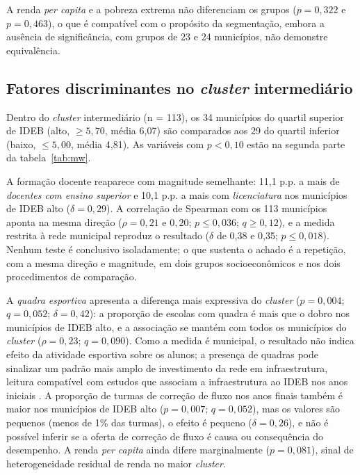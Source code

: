 A renda \textit{per capita} e a pobreza extrema não diferenciam os grupos ($p = 0{,}322$ e $p = 0{,}463$), o que é compatível com o propósito da segmentação, embora a ausência de significância, com grupos de 23 e 24 municípios, não demonstre equivalência.

\subsection{Fatores discriminantes no \textit{cluster} intermediário}

Dentro do \textit{cluster} intermediário (n = 113), os 34 municípios do quartil superior de IDEB (alto, $\geq 5{,}70$, média 6,07) são comparados aos 29 do quartil inferior (baixo, $\leq 5{,}00$, média 4,81). As variáveis com $p < 0{,}10$ estão na segunda parte da tabela~\ref{tab:mw}.

A formação docente reaparece com magnitude semelhante: 11,1 p.p. a mais de \textit{docentes com ensino superior} e 10,1 p.p. a mais com \textit{licenciatura} nos municípios de IDEB alto ($\delta = 0{,}29$). A correlação de Spearman com os 113 municípios aponta na mesma direção ($\rho = 0{,}21$ e $0{,}20$; $p \leq 0{,}036$; $q \geq 0{,}12$), e a medida restrita à rede municipal reproduz o resultado ($\delta$ de 0,38 e 0,35; $p \leq 0{,}018$). Nenhum teste é conclusivo isoladamente; o que sustenta o achado é a repetição, com a mesma direção e magnitude, em dois grupos socioeconômicos e nos dois procedimentos de comparação.

A \textit{quadra esportiva} apresenta a diferença mais expressiva do \textit{cluster} ($p = 0{,}004$; $q = 0{,}052$; $\delta = 0{,}42$): a proporção de escolas com quadra é mais que o dobro nos municípios de IDEB alto, e a associação se mantém com todos os municípios do \textit{cluster} ($\rho = 0{,}23$; $q = 0{,}090$). Como a medida é municipal, o resultado não indica efeito da atividade esportiva sobre os alunos; a presença de quadras pode sinalizar um padrão mais amplo de investimento da rede em infraestrutura, leitura compatível com estudos que associam a infraestrutura ao IDEB nos anos iniciais \parencite{alves2013, vasconcelos2021}. A proporção de turmas de correção de fluxo nos anos finais também é maior nos municípios de IDEB alto ($p = 0{,}007$; $q = 0{,}052$), mas os valores são pequenos (menos de 1\% das turmas), o efeito é pequeno ($\delta = 0{,}26$), e não é possível inferir se a oferta de correção de fluxo é causa ou consequência do desempenho. A renda \textit{per capita} ainda difere marginalmente ($p = 0{,}081$), sinal de heterogeneidade residual de renda no maior \textit{cluster}.

